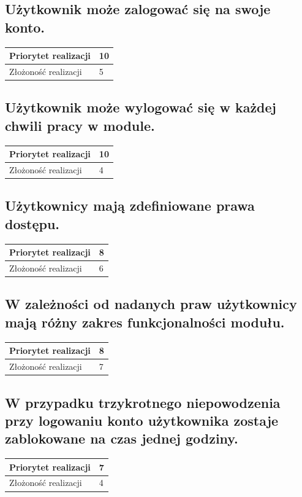 \documentclass[11pt, a4paper, oneside]{report}
\begin{document}
\subsection{Użytkownik może zalogować się na swoje konto.}
\begin{center}
\begin{tabular}[c]{| l | l | }
  \hline			
  Priorytet realizacji & 10 \\
  \hline
  Złożoność realizacji & 5 \\
  \hline  
\end{tabular}
\end{center}
\subsection{Użytkownik może wylogować się w każdej chwili pracy w module.}
\begin{center}
\begin{tabular}[c]{| l | l | }
  \hline			
  Priorytet realizacji & 10 \\
  \hline
  Złożoność realizacji & 4 \\
  \hline  
\end{tabular}
\end{center}
\subsection{Użytkownicy mają zdefiniowane prawa dostępu.}
\begin{center}
\begin{tabular}[c]{| l | l | }
  \hline			
  Priorytet realizacji & 8 \\
  \hline
  Złożoność realizacji & 6 \\
  \hline  
\end{tabular}
\end{center}
\subsection{W zależności od nadanych praw użytkownicy mają różny zakres funkcjonalności modułu.}
\begin{center}
\begin{tabular}[c]{| l | l | }
  \hline			
  Priorytet realizacji & 8 \\
  \hline
  Złożoność realizacji & 7 \\
  \hline  
\end{tabular}
\end{center}

\subsection{W przypadku trzykrotnego niepowodzenia przy logowaniu konto użytkownika zostaje zablokowane na czas jednej godziny.}
\begin{center}
\begin{tabular}[c]{| l | l | }
  \hline			
  Priorytet realizacji & 7 \\
  \hline
  Złożoność realizacji & 4 \\
  \hline  
\end{tabular}
\end{center}
\end{document}
